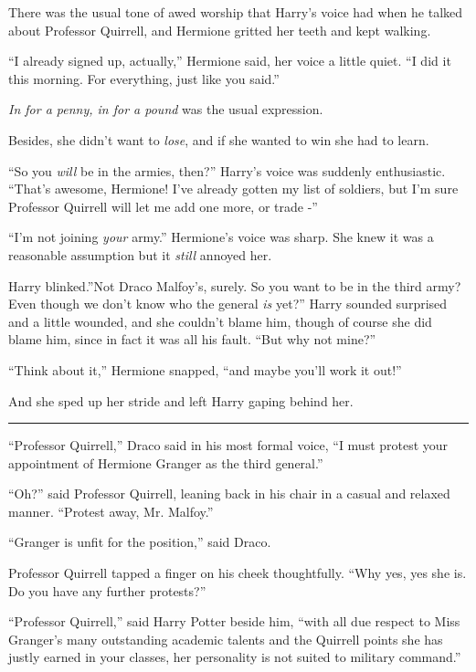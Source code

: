 There was the usual tone of awed worship that Harry's voice had when he
talked about Professor Quirrell, and Hermione gritted her teeth and kept
walking.

``I already signed up, actually,'' Hermione said, her voice a little
quiet. ``I did it this morning. For everything, just like you said.''

\emph{In for a penny, in for a pound} was the usual expression.

Besides, she didn't want to \emph{lose}, and if she wanted to win she
had to learn.

``So you \emph{will} be in the armies, then?'' Harry's voice was suddenly
enthusiastic. ``That's awesome, Hermione! I've already gotten my list of
soldiers, but I'm sure Professor Quirrell will let me add one more, or
trade -''

``I'm not joining \emph{your} army.'' Hermione's voice was sharp. She
knew it was a reasonable assumption but it \emph{still} annoyed her.

Harry blinked.''Not Draco Malfoy's, surely. So you want to be in the
third army? Even though we don't know who the general \emph{is} yet?''
Harry sounded surprised and a little wounded, and she couldn't blame
him, though of course she did blame him, since in fact it was all his
fault. ``But why not mine?''

``Think about it,'' Hermione snapped, ``and maybe you'll work it out!''

And she sped up her stride and left Harry gaping behind her.

\begin{center}\rule{3in}{0.4pt}\end{center}

``Professor Quirrell,'' Draco said in his most formal voice, ``I must
protest your appointment of Hermione Granger as the third general.''

``Oh?'' said Professor Quirrell, leaning back in his chair in a casual
and relaxed manner. ``Protest away, Mr. Malfoy.''

``Granger is unfit for the position,'' said Draco.

Professor Quirrell tapped a finger on his cheek thoughtfully. ``Why yes,
yes she is. Do you have any further protests?''

``Professor Quirrell,'' said Harry Potter beside him, ``with all due
respect to Miss Granger's many outstanding academic talents and the
Quirrell points she has justly earned in your classes, her personality
is not suited to military command.''

